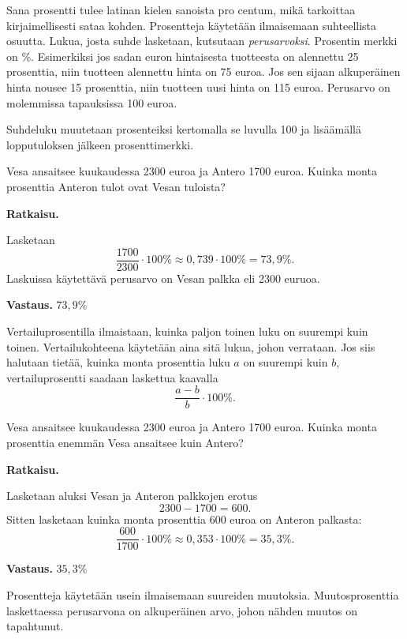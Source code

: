 Sana prosentti tulee latinan kielen sanoista pro centum, mikä tarkoittaa kirjaimellisesti sataa kohden. Prosentteja käytetään ilmaisemaan suhteellista osuutta. Lukua, josta suhde lasketaan, kutsutaan \emph{perusarvoksi}. Prosentin merkki on \%. Esimerkiksi jos sadan euron hintaisesta tuotteesta on alennettu 25 prosenttia, niin tuotteen alennettu hinta on 75 euroa. Jos sen sijaan alkuperäinen hinta nousee 15 prosenttia, niin tuotteen uusi hinta on 115 euroa. Perusarvo on molemmissa tapauksissa 100 euroa.



Suhdeluku muutetaan prosenteiksi kertomalla se luvulla 100 ja lisäämällä lopputuloksen jälkeen prosenttimerkki.

\begin{esimerkki}
Vesa ansaitsee kuukaudessa 2300 euroa ja Antero 1700 euroa.
Kuinka monta prosenttia Anteron tulot ovat Vesan tuloista? 

{\bf Ratkaisu.}

Lasketaan
\[
\frac{1700}{2300} \cdot 100 \% \approx 0,739\cdot 100 \% = 73,9 \%.
\]
Laskuissa käytettävä perusarvo on Vesan palkka eli 2300 euruoa.

{\bf Vastaus.}
 $73,9 \%$
\end{esimerkki}


Vertailuprosentilla ilmaistaan, kuinka paljon toinen luku on suurempi kuin toinen. Vertailukohteena käytetään aina sitä lukua, johon verrataan. Jos siis halutaan tietää, kuinka monta prosenttia luku $a$ on suurempi kuin $b$, vertailuprosentti saadaan laskettua kaavalla
\[
\frac{a-b}{b} \cdot 100 \%.
\]

\begin{esimerkki}
Vesa ansaitsee kuukaudessa 2300 euroa ja Antero 1700 euroa.
Kuinka monta prosenttia enemmän Vesa ansaitsee kuin Antero?

{\bf Ratkaisu.}

Lasketaan aluksi Vesan ja Anteron palkkojen erotus
\[
2300-1700 = 600.
\]
Sitten lasketaan kuinka monta prosenttia 600 euroa on Anteron palkasta:
\[
\frac{600}{1700} \cdot 100 \% \approx 0,353\cdot 100\% = 35,3 \%.
\]

{\bf Vastaus.}
$35,3 \%$
\end{esimerkki}

Prosentteja käytetään usein ilmaisemaan suureiden muutoksia. Muutosprosenttia laskettaessa perusarvona on alkuperäinen arvo, johon nähden muutos on tapahtunut.

